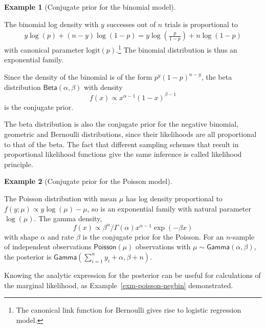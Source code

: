 \documentclass[
  11pt,
  letterpaper,
]{scrbook}
\theoremstyle{definition}
\theoremstyle{definition}
\newtheorem{example}{Example}[chapter]
\theoremstyle{definition}
\theoremstyle{plain}
\theoremstyle{plain}
\theoremstyle{remark}
\begin{document}
\begin{example}[Conjugate prior for the binomial
model]\protect\hypertarget{exm-conjugatepriors-binom}{}\label{exm-conjugatepriors-binom}

The binomial log density with \(y\) successes out of \(n\) trials is
proportional to \begin{align*}
y \log(p) + (n-y) \log(1-p) = y\log\left( \frac{p}{1-p}\right) + n \log(1-p)
\end{align*} with canonical parameter \(\mathrm{logit}(p)\).\footnote{The
  canonical link function for Bernoulli gives rise to logistic
  regression model.} The binomial distribution is thus an exponential
family.

Since the density of the binomial is of the form \(p^y(1-p)^{n-y}\), the
beta distribution \(\mathsf{Beta}(\alpha, \beta)\) with density
\[f(x) \propto x^{\alpha-1} (1-x)^{\beta-1}\] is the conjugate prior.

The beta distribution is also the conjugate prior for the negative
binomial, geometric and Bernoulli distributions, since their likelihoods
are all proportional to that of the beta. The fact that different
sampling schemes that result in proportional likelihood functions give
the same inference is called likelihood principle.

\end{example}

\begin{example}[Conjugate prior for the Poisson
model]\protect\hypertarget{exm-conjugatepriors-poisson}{}\label{exm-conjugatepriors-poisson}

The Poisson distribution with mean \(\mu\) has log density proportional
to \(f(y; \mu) \propto y\log(\mu) -\mu\), so is an exponential family
with natural parameter \(\log(\mu)\). The gamma density,
\[ f(x) \propto \beta^{\alpha}/\Gamma(\alpha)x^{\alpha-1} \exp(-\beta x)\]
with shape \(\alpha\) and rate \(\beta\) is the conjugate prior for the
Poisson. For an \(n\)-sample of independent observations
\(\mathsf{Poisson}(\mu)\) observations with
\(\mu \sim \mathsf{Gamma}(\alpha, \beta)\), the posterior is
\(\mathsf{Gamma}(\sum_{i=1}^n y_i + \alpha, \beta + n)\).

\end{example}

Knowing the analytic expression for the posterior can be useful for
calculations of the marginal likelihood, as
Example~\ref{exm-poisson-negbin} demonstrated.
\end{document}

